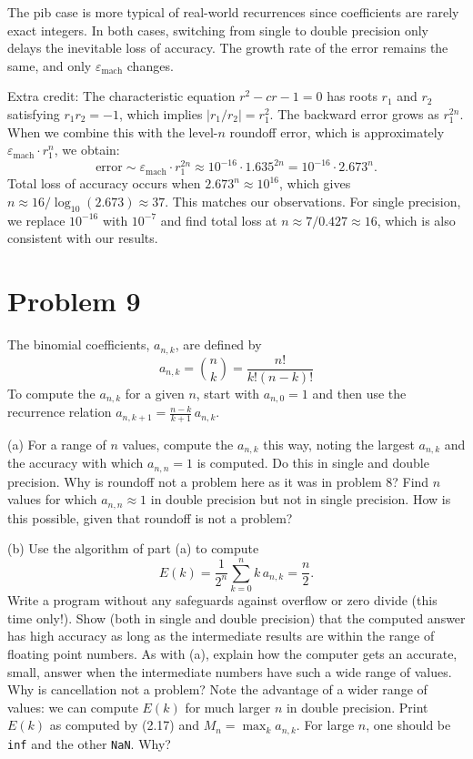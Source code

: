 \documentclass[letterpaper, 11pt]{article}
\newcommand{\1}{\mathds{1}}	%
\theoremstyle{definition}
\begin{document}
The pib case is more typical of real-world recurrences since coefficients are rarely exact integers. In both cases, switching from single to double precision only delays the inevitable loss of accuracy. The growth rate of the error remains the same, and only $\varepsilon_{\mathrm{mach}}$ changes.

\medskip

Extra credit: The characteristic equation $r^2 - cr - 1 = 0$ has roots $r_1$ and $r_2$ satisfying $r_1 r_2 = -1$, which implies $|r_1/r_2| = r_1^2$. The backward error grows as $r_1^{2n}$. When we combine this with the level-$n$ roundoff error, which is approximately $\varepsilon_{\mathrm{mach}} \cdot r_1^n$, we obtain:
\[
\text{error} \sim \varepsilon_{\mathrm{mach}} \cdot r_1^{2n} \approx 10^{-16} \cdot 1.635^{2n} = 10^{-16} \cdot 2.673^n.
\]
Total loss of accuracy occurs when $2.673^n \approx 10^{16}$, which gives $n \approx 16/\log_{10}(2.673) \approx 37$. This matches our observations. For single precision, we replace $10^{-16}$ with $10^{-7}$ and find total loss at $n \approx 7/0.427 \approx 16$, which is also consistent with our results.
\section*{Problem 9}

The binomial coefficients, $a_{n,k}$, are defined by
\[
a_{n,k} = \binom{n}{k} = \frac{n!}{k!(n-k)!}
\]
To compute the $a_{n,k}$ for a given $n$, start with $a_{n,0} = 1$ and then use the recurrence relation $a_{n,k+1} = \frac{n-k}{k+1}\,a_{n,k}$.

(a) For a range of $n$ values, compute the $a_{n,k}$ this way, noting the largest $a_{n,k}$ and the accuracy with which $a_{n,n} = 1$ is computed. Do this in single and double precision. Why is roundoff not a problem here as it was in problem 8? Find $n$ values for which $a_{n,n} \approx 1$ in double precision but not in single precision. How is this possible, given that roundoff is not a problem?

(b) Use the algorithm of part (a) to compute
\[
E(k) = \frac{1}{2^n}\sum_{k=0}^{n} k\,a_{n,k} = \frac{n}{2}. \tag{2.17}
\]
Write a program without any safeguards against overflow or zero divide (this time only!). Show (both in single and double precision) that the computed answer has high accuracy as long as the intermediate results are within the range of floating point numbers. As with (a), explain how the computer gets an accurate, small, answer when the intermediate numbers have such a wide range of values. Why is cancellation not a problem? Note the advantage of a wider range of values: we can compute $E(k)$ for much larger $n$ in double precision. Print $E(k)$ as computed by (2.17) and $M_n = \max_k a_{n,k}$. For large $n$, one should be \texttt{inf} and the other \texttt{NaN}. Why?
\end{document}
